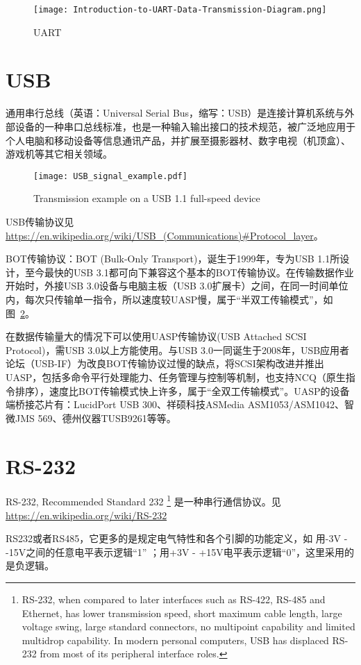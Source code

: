 \begin{figure}[htbp]
    \centering
    \texttt{[image: Introduction-to-UART-Data-Transmission-Diagram.png]}
    \caption{UART}
    \label{fig:UART}
\end{figure}

\section{USB}

通用串行总线（英语：Universal Serial Bus，缩写：USB）是连接计算机系统与外部设备的一种串口总线标准，也是一种输入输出接口的技术规范，被广泛地应用于个人电脑和移动设备等信息通讯产品，并扩展至摄影器材、数字电视（机顶盒）、游戏机等其它相关领域。

\begin{figure}[htbp]
    \centering
    \texttt{[image: USB\_signal\_example.pdf]}
    \caption{Transmission example on a USB 1.1 full-speed device}
    \label{fig:USB-Transmission}
\end{figure}

USB传输协议见\url{https://en.wikipedia.org/wiki/USB_(Communications)#Protocol_layer}。

BOT传输协议：BOT (Bulk-Only Transport)，诞生于1999年，专为USB 1.1所设计，至今最快的USB 3.1都可向下兼容这个基本的BOT传输协议。在传输数据作业开始时，外接USB 3.0设备与电脑主板（USB 3.0扩展卡）之间，在同一时间单位内，每次只传输单一指令，所以速度较UASP慢，属于“半双工传输模式”，如图~\ref{fig:USB-Transmission}。

在数据传输量大的情况下可以使用UASP传输协议(USB Attached SCSI Protocol)，需USB 3.0以上方能使用。与USB 3.0一同诞生于2008年，USB应用者论坛（USB-IF）为改良BOT传输协议过慢的缺点，将SCSI架构改进并推出UASP，包括多命令平行处理能力、任务管理与控制等机制，也支持NCQ（原生指令排序），速度比BOT传输模式快上许多，属于“全双工传输模式”。UASP的设备端桥接芯片有：LucidPort USB 300、祥硕科技ASMedia ASM1053/ASM1042、智微JMS 569、德州仪器TUSB9261等等。

\section{RS-232}

RS-232, Recommended Standard 232 \footnote{RS-232, when compared to later interfaces such as RS-422, RS-485 and Ethernet, has lower transmission speed, short maximum cable length, large voltage swing, large standard connectors, no multipoint capability and limited multidrop capability. In modern personal computers, USB has displaced RS-232 from most of its peripheral interface roles.} 是一种串行通信协议。见\url{https://en.wikipedia.org/wiki/RS-232}

RS232或者RS485，它更多的是规定电气特性和各个引脚的功能定义，如 用-3V - -15V之间的任意电平表示逻辑“1” ；用+3V - +15V电平表示逻辑“0”，这里采用的是负逻辑。